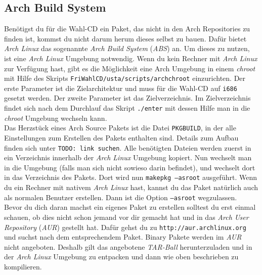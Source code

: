 \documentclass[a4paper,10pt]{article}
\begin{document}
\subsection{Arch Build System}
Benötigst du für die Wahl-CD ein Paket, das nicht in den Arch Repositories zu finden ist, kommst du nicht darum herum dieses selbst zu bauen. Dafür bietet \textit{Arch Linux} das sogenannte \textit{Arch Build System} (\textit{ABS}) an. Um dieses zu nutzen, ist eine \textit{Arch Linux} Umgebung notwendig. Wenn du kein Rechner mit \textit{Arch Linux} zur Verfügung hast, gibt es die Möglichkeit eine Arch Umgebung in einem \textit{chroot} mit Hilfe des Skripts \texttt{FriWahlCD/usta/scripts/archchroot} einzurichten. Der erste Parameter ist die Zielarchitektur und muss für die Wahl-CD auf \texttt{i686} gesetzt werden. Der zweite Parameter ist das Zielverzeichnis. Im Zielverzeichnis findet sich nach dem Durchlauf das Skript \texttt{./enter} mit dessen Hilfe man in die \textit{chroot} Umgebung wechseln kann. \\
Das Herzstück eines Arch Source Pakets ist die Datei \texttt{PKGBUILD}, in der alle Einstellungen zum Erstellen des Pakets enthalten sind. Details zum Aufbau finden sich unter \texttt{TODO: link suchen}. Alle benötigten Dateien werden zuerst in ein Verzeichnis innerhalb der \textit{Arch Linux} Umgebung kopiert. Nun wechselt man in die Umgebung (falls man sich nicht sowieso darin befindet), und wechselt dort in das Verzeichnis des Pakets. Dort wird nun \texttt{makepkg --asroot} ausgeführt. Wenn du ein Rechner mit nativem \textit{Arch Linux} hast, kannst du das Paket natürlich auch als normalen Benutzer erstellen. Dann ist die Option \texttt{--asroot} wegzulassen. \\
Bevor du dich daran machst ein eigenes Paket zu erstellen solltest du erst einmal schauen, ob dies nicht schon jemand vor dir gemacht hat und in das \textit{Arch User Repository} (\textit{AUR}) gestellt hat. Dafür gehst du zu \texttt{http://aur.archlinux.org} und suchst nach dem entsprechendem Paket. Binary Pakete werden im \textit{AUR} nicht angeboten. Deshalb gilt das angebotene \textit{TAR-Ball} herunterzuladen und in der \textit{Arch Linux} Umgebung zu entpacken und dann wie oben beschrieben zu kompilieren.
\end{document}
